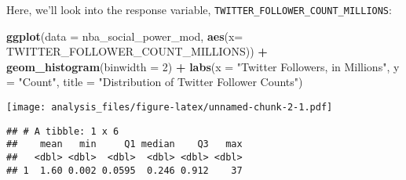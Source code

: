 \documentclass[]{article}
\newenvironment{Shaded}{\begin{snugshade}}{\end{snugshade}}
\newcommand{\DataTypeTok}[1]{\textcolor[rgb]{0.13,0.29,0.53}{#1}}
\newcommand{\DecValTok}[1]{\textcolor[rgb]{0.00,0.00,0.81}{#1}}
\newcommand{\FloatTok}[1]{\textcolor[rgb]{0.00,0.00,0.81}{#1}}
\newcommand{\KeywordTok}[1]{\textcolor[rgb]{0.13,0.29,0.53}{\textbf{#1}}}
\newcommand{\NormalTok}[1]{#1}
\newcommand{\OperatorTok}[1]{\textcolor[rgb]{0.81,0.36,0.00}{\textbf{#1}}}
\newcommand{\StringTok}[1]{\textcolor[rgb]{0.31,0.60,0.02}{#1}}
\begin{document}
Here, we'll look into the response variable,
\texttt{TWITTER\_FOLLOWER\_COUNT\_MILLIONS}:

\begin{Shaded}
\begin{Highlighting}[]
\KeywordTok{ggplot}\NormalTok{(}\DataTypeTok{data =}\NormalTok{ nba_social_power_mod,}
       \KeywordTok{aes}\NormalTok{(}\DataTypeTok{x=}\NormalTok{ TWITTER_FOLLOWER_COUNT_MILLIONS)) }\OperatorTok{+}\StringTok{ }
\StringTok{  }\KeywordTok{geom_histogram}\NormalTok{(}\DataTypeTok{binwidth =} \DecValTok{2}\NormalTok{) }\OperatorTok{+}
\StringTok{  }\KeywordTok{labs}\NormalTok{(}\DataTypeTok{x =} \StringTok{"Twitter Followers, in Millions"}\NormalTok{,}
       \DataTypeTok{y =} \StringTok{"Count"}\NormalTok{,}
       \DataTypeTok{title =} \StringTok{"Distribution of Twitter Follower Counts"}\NormalTok{)}
\end{Highlighting}
\end{Shaded}

\texttt{[image: analysis\_files/figure-latex/unnamed-chunk-2-1.pdf]}

\begin{Shaded}
\end{Shaded}

\begin{verbatim}
## # A tibble: 1 x 6
##    mean   min     Q1 median    Q3   max
##   <dbl> <dbl>  <dbl>  <dbl> <dbl> <dbl>
## 1  1.60 0.002 0.0595  0.246 0.912    37
\end{verbatim}

\begin{Shaded}
\end{Shaded}
\end{document}
